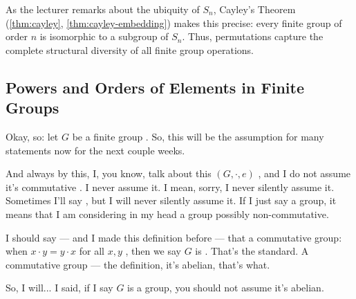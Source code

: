 \begin{aiNote}
As the lecturer remarks about the ubiquity of $S_n$, Cayley's Theorem (\cref{thm:cayley}, \cref{thm:cayley-embedding}) makes this precise: every finite group of order $n$ is isomorphic to a subgroup of $S_n$. Thus, permutations capture the complete structural diversity of all finite group operations.
\end{aiNote}

\begin{hidden}
\end{hidden}

\subsection{Powers and Orders of Elements in Finite Groups}

\begin{speech}[01:17:00 - 01:18:13]
Okay, so: let $G$ be a finite group . So, this will be the assumption for many statements now for the next couple weeks.

And always by this, I, you know, talk about this $(G, \cdot, e)$ , and I do not assume it's commutative . I never assume it. I mean, sorry, I never silently assume it. Sometimes I'll say , but I will never silently assume it. If I just say a group, it means that I am considering in my head a group possibly non-commutative.

I should say --- and I made this definition before --- that a commutative group: when $x \cdot y = y \cdot x$ for all $x, y$ , then we say $G$ is  . That's the standard. A commutative group --- the definition, it's abelian, that's what.

So, I will... I said, if I say $G$ is a group, you should not assume it's abelian.
\end{speech}


